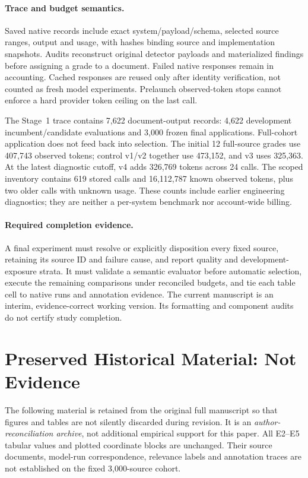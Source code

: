 \documentclass[11pt]{article}
\begin{document}
\paragraph{Trace and budget semantics.}
Saved native records include exact system/payload/schema, selected source
ranges, output and usage, with hashes binding source and implementation
snapshots. Audits reconstruct original detector payloads and materialized
findings before assigning a grade to a document. Failed native responses
remain in accounting. Cached responses are reused only after identity
verification, not counted as fresh model experiments.
Prelaunch observed-token stops cannot enforce a hard provider token ceiling
on the last call.

The Stage~1 trace contains 7,622 document-output records: 4,622 development
incumbent/candidate evaluations and 3,000 frozen final applications.
Full-cohort application does not feed back into selection.
The initial 12 full-source grades use 407,743 observed tokens; control
v1/v2 together use 473,152, and v3 uses 325,363. At the latest diagnostic
cutoff, v4 adds 326,769 tokens across 24 calls. The scoped inventory
contains 619 stored calls and 16,112,787 known
observed tokens, plus two older calls with unknown usage. These counts
include earlier engineering diagnostics; they are neither a per-system
benchmark nor account-wide billing.

\paragraph{Required completion evidence.}
A final experiment must resolve or explicitly disposition every fixed
source, retaining its source ID and failure cause, and report quality and
development-exposure strata. It must validate a semantic evaluator before
automatic selection, execute the remaining comparisons under reconciled
budgets, and tie each table cell to native runs and annotation evidence.
The current manuscript is an interim, evidence-correct working version.
Its formatting and component audits do not certify study completion.

\section{Preserved Historical Material: Not Evidence}
\label{sec:legacy}
The following material is retained from the original full manuscript so
that figures and tables are not silently discarded during revision.
It is an \emph{author-reconciliation archive}, not additional empirical
support for this paper. All E2--E5 tabular values and plotted coordinate
blocks are unchanged. Their source documents, model-run correspondence,
relevance labels and annotation traces are not established on the fixed
3,000-source cohort.
\end{document}
